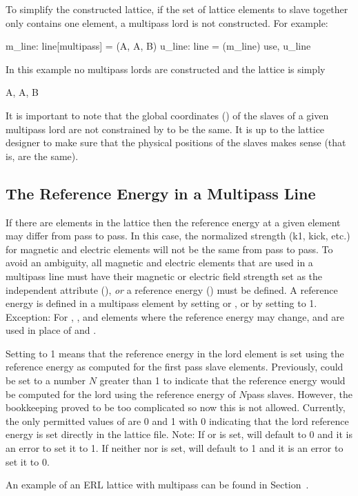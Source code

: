 To simplify the constructed lattice, if the set of lattice elements to slave together only contains
one element, a multipass lord is not constructed. For example:
\begin{example}
  m_line: line[multipass] = (A, A, B)
  u_line: line = (m_line)
  use, u_line
\end{example}
In this example no multipass lords are constructed and the lattice is simply
\begin{example}
  A, A, B
\end{example}

It is important to note that the global coordinates () of the slaves of a given
multipass lord are not constrained by \bmad to be the same. It is up to the lattice designer to make
sure that the physical positions of the slaves makes sense (that is, are the same).

\subsection{The Reference Energy in a Multipass Line}
\label{s:ref.e.multi}

If there are  elements in the lattice then the reference energy at a given element may
differ from pass to pass. In this case, the normalized strength (k1, kick, etc.) for magnetic and
electric elements will not be the same from pass to pass. To avoid an ambiguity, all magnetic and
electric elements that are used in a multipass line must have their magnetic or electric field
strength set as the independent attribute (), {\em or} a reference energy
() must be defined. A reference energy is defined in a multipass element by setting
 or , or by setting  to 1. Exception: For ,
, and  elements where the reference energy may change,  and
 are used in place of  and .

Setting  to 1 means that the reference energy in the lord element is set using the
reference energy as computed for the first pass slave elements. Previously,  could be
set to a number $N$ greater than 1 to indicate that the reference energy would be computed for the
lord using the reference energy of $N$\Th pass slaves. However, the bookkeeping proved to be too
complicated so now this is not allowed. Currently, the only permitted values of  are
0 and 1 with 0 indicating that the lord reference energy is set directly in the lattice file. Note:
If  or  is set,  will default to 0 and it is an error to set it to
1. If neither  nor  is set,  will default to 1 and it is an error
to set it to 0.

An example of an ERL lattice with multipass can be found in Section~.
